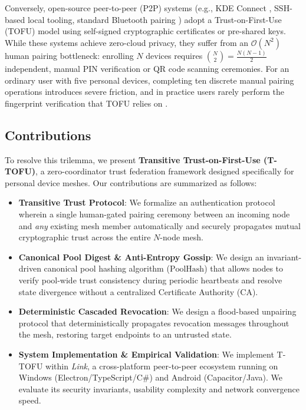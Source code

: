 \documentclass[conference,a4paper]{IEEEtran}
\begin{document}
Conversely, open-source peer-to-peer (P2P) systems (e.g., KDE Connect \cite{kdeconnect}, SSH-based local tooling, standard Bluetooth pairing \cite{antonioli2023bluffs}) adopt a Trust-on-First-Use (TOFU) model using self-signed cryptographic certificates or pre-shared keys. While these systems achieve zero-cloud privacy, they suffer from an $\mathcal{O}(N^2)$ human pairing bottleneck: enrolling $N$ devices requires $\binom{N}{2} = \frac{N(N-1)}{2}$ independent, manual PIN verification or QR code scanning ceremonies. For an ordinary user with five personal devices, completing ten discrete manual pairing operations introduces severe friction, and in practice users rarely perform the fingerprint verification that TOFU relies on \cite{neef2022ssh}.

\subsection{Contributions}
To resolve this trilemma, we present \textbf{Transitive Trust-on-First-Use (T-TOFU)}, a zero-coordinator trust federation framework designed specifically for personal device meshes. Our contributions are summarized as follows:
\begin{itemize}
    \item \textbf{Transitive Trust Protocol}: We formalize an authentication protocol wherein a single human-gated pairing ceremony between an incoming node and \textit{any} existing mesh member automatically and securely propagates mutual cryptographic trust across the entire $N$-node mesh.
    \item \textbf{Canonical Pool Digest \& Anti-Entropy Gossip}: We design an invariant-driven canonical pool hashing algorithm ($\text{PoolHash}$) that allows nodes to verify pool-wide trust consistency during periodic heartbeats and resolve state divergence without a centralized Certificate Authority (CA).
    \item \textbf{Deterministic Cascaded Revocation}: We design a flood-based unpairing protocol that deterministically propagates revocation messages throughout the mesh, restoring target endpoints to an untrusted state.
    \item \textbf{System Implementation \& Empirical Validation}: We implement T-TOFU within \textit{Link}, a cross-platform peer-to-peer ecosystem running on Windows (Electron/TypeScript/C\#) and Android (Capacitor/Java). We evaluate its security invariants, usability complexity and network convergence speed.
\end{itemize}
\end{document}
